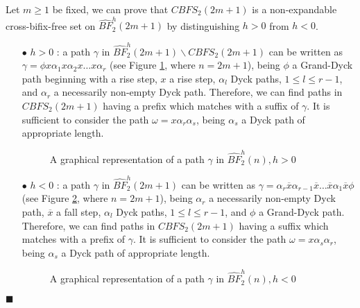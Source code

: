 \documentclass[a4paper,11pt]{article}
\newcommand{\cvd}{\hfill $\blacksquare$\bigskip}
\begin{document}
Let $m \geq 1$ be fixed, we can prove that $CBFS_2(2m+1)$ is a
non-expandable cross-bifix-free set on $\hat{BF}^h_2(2m+1)$ by
distinguishing $h>0$ from $h<0$.
\begin{itemize}
\item[$\bullet$ $h>0$ :] a path $\gamma$ in $\hat{BF}^h_2(2m+1)
\backslash CBFS_2(2m+1)$ can be written as $\gamma=\phi x \alpha_1
x \alpha_2 x \dots x \alpha_r$ (see Figure \ref{classep}, where
$n=2m+1$), being $\phi$ a Grand-Dyck path beginning with a rise
step, $x$ a rise step, $\alpha_l$ Dyck paths, $1 \leq l \leq r-1$,
and $\alpha_r$ a necessarily non-empty Dyck path. Therefore, we
can find paths in $CBFS_2(2m+1)$ having a prefix which matches
with a suffix of $\gamma$. It is sufficient to consider the path
$\omega = x \alpha_r \alpha_s$, being $\alpha_s$ a Dyck path of
appropriate length.

\begin{figure}[!htb]
\begin{center}
 \caption{\small{A
graphical representation of a path $\gamma$ in $\hat{BF}^h_2(n),
h>0$} \label{classep}}\vspace{-15pt}
\end{center}
\end{figure}

\item[$\bullet$ $h<0$ :] a path $\gamma$ in $\hat{BF}^h_2(2m+1)$
can be written as $\gamma= \alpha_r \overline{x} \alpha_{r-1}
\overline{x} \dots \overline{x} \alpha_1 \overline{x} \phi$ (see
Figure \ref{classepnegativa}, where $n=2m+1$), being $\alpha_r$ a
necessarily non-empty Dyck path, $\overline{x}$ a fall step,
$\alpha_l$ Dyck paths, $1 \leq l \leq r-1$, and $\phi$ a
Grand-Dyck path. Therefore, we can find paths in $CBFS_2(2m+1)$
having a suffix which matches with a prefix of $\gamma$. It is
sufficient to consider the path $\omega = x \alpha_s \alpha_r$,
being $\alpha_s$ a Dyck path of appropriate length.

\begin{figure}[!htb]
\begin{center}
 \caption{\small{A
graphical representation of a path $\gamma$ in $\hat{BF}^h_2(n),
h<0$} \label{classepnegativa}}\vspace{-12pt}
\end{center}
\end{figure}
\end{itemize}
\cvd
\end{document}
